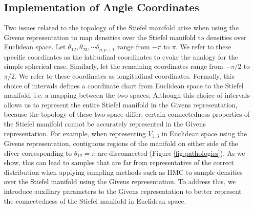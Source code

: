 \documentclass[ba]{imsart}
\numberwithin{equation}{section}
\theoremstyle{plain}
\begin{document}
\subsection{Implementation of Angle Coordinates}
Two issues related to the topology of the Stiefel manifold arise when using the Givens representation to map densities over the Stiefel manifold to densities over Euclidean space. Let $\theta_{12}, \theta_{23}, \cdots \theta_{p,p+1}$ range from $-\pi$ to $\pi$. We refer to these specific coordinates as the latitudinal coordinates to evoke the analogy for the simple spherical case. Similarly, let the remaining coordinates range from $-\pi/2$ to $\pi/2$. We refer to these coordinates as longitudinal coordinates. Formally, this choice of intervals defines a coordinate chart from Euclidean space to the Stiefel manifold, i.e. a mapping between the two spaces. Although this choice of intervals allows us to represent the entire Stiefel manifold in the Givens representation, because the topology of these two space differ, certain connectedness properties of the Stiefel manifold cannot be accurately represented in the Givens representation. For example, when representing $V_{1,3}$ in Euclidean space using the Givens representation, contiguous regions of the manifold on either side of the sliver corresponding to $\theta_{12} = \pi$ are disconnected (Figure \ref{fig:pathologies}). As we show, this can lead to samples that are far from representative of the correct distribution when applying sampling methods such as HMC to sample densities over the Stiefel manifold using the Givens representation. To address this, we introduce auxiliary parameters to the Givens representation to better represent the connectedness of the Stiefel manifold in Euclidean space.
\end{document}
